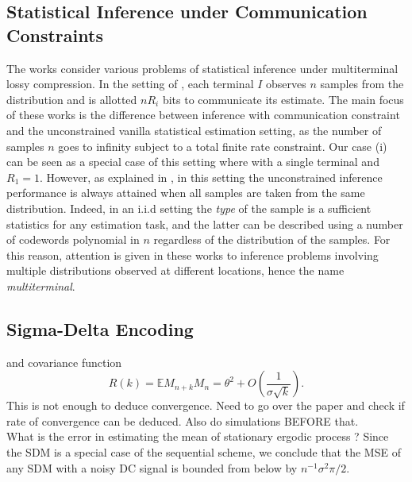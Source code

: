 \documentclass[letterpaper, conference]{IEEEtran}      %
\begin{document}
\subsection{Statistical Inference under Communication Constraints}
The works \cite{han1987hypothesis, zhang1988estimation, 720540} consider various problems of statistical inference under multiterminal lossy compression. In the setting of \cite{han1987hypothesis, zhang1988estimation, 720540}, each terminal $I$ observes $n$ samples from the distribution and is allotted $nR_i$ bits to communicate its estimate.%
The main focus of these works is the difference between inference with communication constraint and the unconstrained vanilla statistical estimation setting, as the number of samples $n$ goes to infinity subject to a total finite rate constraint. Our case (i) can be seen as a special case of this setting where with a single terminal and $R_1 = 1$. However, as explained in \cite[Sec. III]{720540}, in this setting the unconstrained inference performance is always attained when all samples are taken from the same distribution. Indeed, in an i.i.d setting the \emph{type} of the sample \cite{csiszar1998method} is a sufficient statistics for any estimation task, and the latter can be described using a number of codewords polynomial in $n$ regardless of the distribution of the samples. For this reason, attention is given in these works to inference problems involving multiple distributions observed at different locations, hence the name \emph{multiterminal}. 

\subsection{Sigma-Delta Encoding}

and covariance function \cite[Eq. 25]{53738}
\[
R(k) = \mathbb E M_{n+k} M_n = \theta^2 + O \left( \frac{1}{\sigma \sqrt{ k} } \right). 
\]
{\color{red} This is not enough to deduce convergence. Need to go over the paper and check if rate of convergence can be deduced. Also do simulations BEFORE that. \\

What is the error in estimating the mean of stationary ergodic process ? 
}
Since the SDM is a special case of the sequential scheme, we conclude that the MSE of any SDM with a noisy DC signal is bounded from below by $n^{-1} \sigma^2 \pi/2 $.
\end{document}
